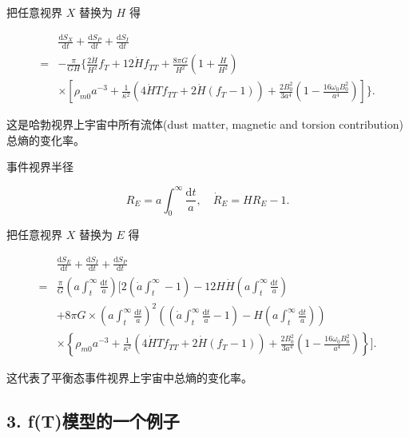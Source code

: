\documentclass[aps,prl,preprint,groupedaddress]{revtex4-2}
\begin{document}
把任意视界 $X$ 替换为 $H$ 得

$$
\begin{aligned}
    &\frac{\mathrm{d}S_X }{\mathrm{d}t } + \frac{\mathrm{d}S_P }{\mathrm{d}t } + \frac{\mathrm{d}S_I }{\mathrm{d}t } \\
    =&-\frac{\pi }{G H} \bigg\{\frac{2\dot{H} }{H^2 } f_T + 12\dot{H}f_{TT} +\frac{8\pi G }{H^2 }\left(1+\frac{\dot{H} }{H^2 }  \right) \\
    &\times \left[\rho_{m0}a^{-3} + \frac{1 }{\kappa^2 } \left(4\dot{H}T f_{TT} + 2\dot{H}\left(f_T-1 \right) \right) + \frac{2 B_0^2 }{3a^4 } \left(1-\frac{16\omega_0 B_0^2 }{a^4 }  \right) \right] \bigg\}.
    \end{aligned}
$$

这是哈勃视界上宇宙中所有流体(dust matter, magnetic and torsion contribution)总熵的变化率。

事件视界半径

$$
R_E = a\int_0^{\infty} \frac{\mathrm{d}t }{a } ,\quad
\dot{R}_E = H R_E - 1.
$$

把任意视界 $X$ 替换为 $E$ 得

$$
\begin{aligned}
    &\frac{\mathrm{d}S_E}{\mathrm{d}t} + \frac{\mathrm{d}S_I}{\mathrm{d}t} + \frac{\mathrm{d}S_P}{\mathrm{d}t} \\
    =&\frac{\pi}{G} \left(a\int_t^\infty \frac{\mathrm{d}t}{a}\right)\bigg[2\left(\dot{a}\int_t^\infty -1 \right) - 12H\dot{H} \left(a\int_t^\infty \frac{\mathrm{d}t}{a}\right) \\
    &+8\pi G\times \left(a\int_t^\infty\frac{\mathrm{d}t}{a}\right)^2\left(\left(\dot{a}\int_t^\infty\frac{\mathrm{d}t}{a}-1\right)-H\left(a\int_t^\infty\frac{\mathrm{d}t}{a}\right)\right) \\
    &\times \left\{\rho_{m0}a^{-3} + \frac{1}{\kappa^2} \left(4\dot{H}T f_{TT} + 2\dot{H}(f_T-1)\right) + \frac{2B_0^2}{3a^4}\left(1-\frac{16\omega_0B_0^2}{a^4}\right) \right\} \bigg]. 
\end{aligned}
$$

这代表了平衡态事件视界上宇宙中总熵的变化率。


\subsection{3. f(T)模型的一个例子}

\end{document}
